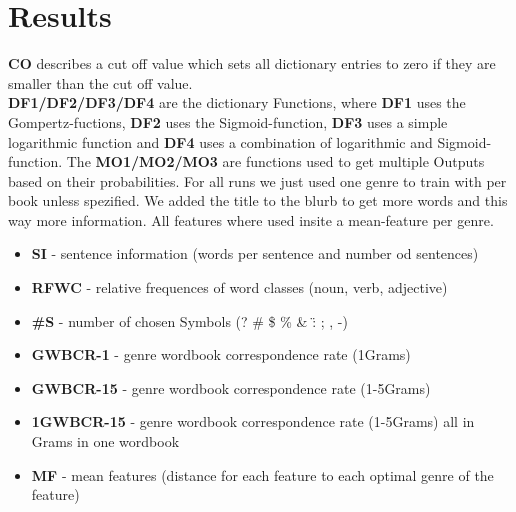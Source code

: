 \documentclass{article}
\begin{document}
\section{Results}

\textbf{CO} describes a cut off value which sets all dictionary entries to zero if they are smaller than the cut off value.\\
\textbf{DF1/DF2/DF3/DF4} are the dictionary Functions, where \textbf{DF1} uses the Gompertz-fuctions, \textbf{DF2} uses the Sigmoid-function, \textbf{DF3} uses a simple logarithmic function and \textbf{DF4} uses a combination of logarithmic and Sigmoid-function.
The \textbf{MO1/MO2/MO3} are functions used to get multiple Outputs based on their probabilities.
For all runs we just used one genre to train with per book unless spezified. We added the title to the blurb to get more words and this way more information. All features where used insite a mean-feature per genre.\\

\begin{itemize}
    \item \textbf{SI} - sentence information (words per sentence and number od sentences)
    \item \textbf{RFWC} - relative frequences of word classes (noun, verb, adjective)
    \item \textbf{\#S} - number of chosen Symbols (? \# \$ \% \& \" : ; , -)
    \item \textbf{GWBCR-1} - genre wordbook correspondence rate (1Grams)
    \item \textbf{GWBCR-15} - genre wordbook correspondence rate (1-5Grams)
    \item \textbf{1GWBCR-15} - genre wordbook correspondence rate (1-5Grams) all in Grams in one wordbook
    \item \textbf{MF} - mean features (distance for each feature to each optimal genre of the feature)
\end{itemize}
\end{document}
